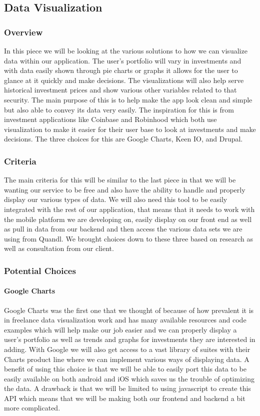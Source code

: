 \documentclass[onecolumn, draftclsnofoot,10pt, compsoc]{IEEEtran}
\begin{document}
\subsection{Data Visualization}

\subsubsection{Overview}
In this piece we will be looking at the various solutions to how we can visualize data within our application. The user’s portfolio will vary in investments and with data easily shown through pie charts or graphs it allows for the user to glance at it quickly and make decisions. The visualizations will also help serve historical investment prices and show various other variables related to that security. The main purpose of this is to help make the app look clean and simple but also able to convey its data very easily. The inspiration for this is from investment applications like Coinbase and Robinhood which both use visualization to make it easier for their user base to look at investments and make decisions. The three choices for this are Google Charts, Keen IO, and Drupal. 

\subsubsection{Criteria}
The main criteria for this will be similar to the last piece in that we will be wanting our service to be free and also have the ability to handle and properly display our various types of data. We will also need this tool to be easily integrated with the rest of our application, that means that it needs to work with the mobile platform we are developing on, easily display on our front end as well as pull in data from our backend and then access the various data sets we are using from Quandl.  We brought choices down to these three based on research as well as consultation from our client. 

\subsubsection{Potential Choices}

\paragraph{Google Charts}
Google Charts was the first one that we thought of because of how prevalent it is in freelance data visualization work and has many available resources and code examples which will help make our job easier and we can properly display a user’s portfolio as well as trends and graphs for investments they are interested in adding. With Google we will also get access to a vast library of suites with their Charts product line where we can implement various ways of displaying data. A benefit of using this choice is that we will be able to easily port this data to be easily available on both android and iOS which saves us the trouble of optimizing the data. A drawback is that we will be limited to using javascript to create this API which means that we will be making both our frontend and backend a bit more complicated.
\end{document}
